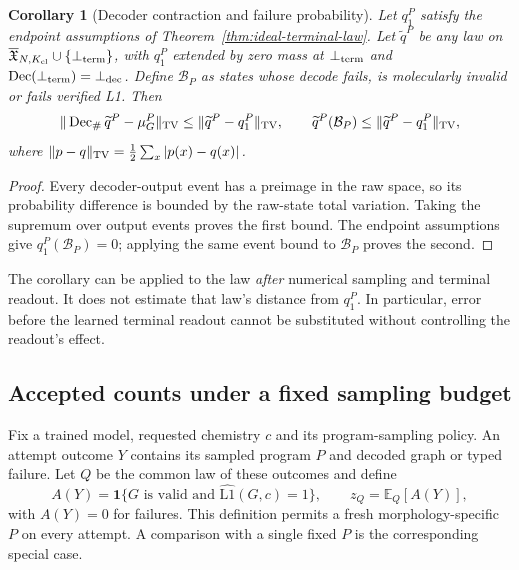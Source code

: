 \documentclass{article}
\newtheorem{corollary}[theorem]{Corollary}
\theoremstyle{definition}
\begin{document}
\begin{corollary}[Decoder contraction and failure probability]
\label{cor:decoder-contraction}
Let $q_1^P$ satisfy the endpoint assumptions of Theorem~\ref{thm:ideal-terminal-law}. Let
$\widetilde q^P$ be any law on
$\overline{\mathfrak X}_{N,K_{\rm cl}}\cup\{\bot_{\rm term}\}$, with $q_1^P$ extended by zero
mass at $\bot_{\rm term}$ and $\operatorname{Dec}(\bot_{\rm term})=\bot_{\rm dec}$.
Define $\mathcal B_P$ as states whose decode fails, is molecularly invalid or fails verified L1.
Then
\begin{equation}
 \|\operatorname{Dec}_{\#}\widetilde q^P-\mu_G^P\|_{\rm TV}
 \leq\|\widetilde q^P-q_1^P\|_{\rm TV},\qquad
 \widetilde q^P(\mathcal B_P)\leq\|\widetilde q^P-q_1^P\|_{\rm TV},
\end{equation}
where $\|p-q\|_{\rm TV}=\frac12\sum_x|p(x)-q(x)|$.
\end{corollary}
\begin{proof}
Every decoder-output event has a preimage in the raw space, so its probability difference is bounded
by the raw-state total variation. Taking the supremum over output events proves the first bound.
The endpoint assumptions give $q_1^P(\mathcal B_P)=0$; applying the same event bound to
$\mathcal B_P$ proves the second.
\end{proof}
The corollary can be applied to the law \emph{after} numerical sampling and terminal readout.
It does not estimate that law's distance from $q_1^P$. In particular, error before the
learned terminal readout cannot be substituted without controlling the readout's effect.

\subsection{Accepted counts under a fixed sampling budget}

Fix a trained model, requested chemistry $c$ and its program-sampling policy. An attempt outcome $Y$
contains its sampled program $P$ and decoded graph or typed failure. Let $Q$ be the common law of
these outcomes and define
\begin{equation}
 A(Y)=\mathbf1\{G\text{ is valid and }\widehat{\mathrm{L1}}(G,c)=1\},\qquad
 z_Q=\mathbb E_Q[A(Y)],
\end{equation}
with $A(Y)=0$ for failures. This definition permits a fresh morphology-specific $P$ on every
attempt. A comparison with a single fixed $P$ is the corresponding special case.
\end{document}
